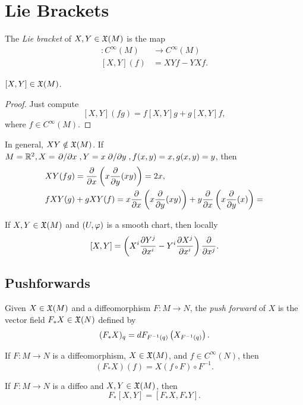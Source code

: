\section{Lie Brackets}
\begin{definition}
    The \textit{Lie bracket} of $X,Y \in \frak{X}(M)$ is the map
    \begin{align*}
    [X,Y]: C^\infty(M) &\longrightarrow C^\infty(M) \\
    [X,Y](f) &= XYf - YXf.
    \end{align*}
\end{definition}
\begin{lemma} %
    $[X,Y] \in \frak{X}(M)$. 
\end{lemma}
\begin{proof}
    Just compute
    $$[X,Y](fg) = f[X,Y]g + g[X,Y]f, $$ where $f \in C^\infty(M)$. 
\end{proof}
\begin{example}
    In general, $XY \notin \frak{X}(M)$. If $M=\mathbb{R}^2, X=\pdv*{}{x}, Y=x\pdv*{}{y}, f(x,y)=x, g(x,y)=y$, then 
    \begin{align*}
    &XY(fg) = \pdv{}{x}\left( {x\pdv{}{y}}(xy) \right) = 2x, \\
    &fXY(g) + gXY(f) = x\pdv{}{x}\left( {x\pdv{}{y}}(xy) \right) + y \pdv{}{x}\left( x{\pdv{}{y}}(x) \right) = 
    \end{align*}
\end{example}

\begin{proposition}
    If $X,Y \in \frak{X}(M)$ and $(U,\varphi)$ is a smooth chart, then locally
    $$ [X,Y] = \left(X^i \pdv{Y^j}{x^i} - Y^i \pdv{X^j}{x^i}\right) \pdv{}{x^j}. $$
\end{proposition}

\begin{proposition}\label{8.28}
    
\end{proposition}

\subsection*{Pushforwards}
Given $X \in \frak{X}(M)$ and a diffeomorphism $F:M \to N$, the \textit{push forward} of $X$ is the vector field $F_* X \in \frak{X}(N)$ defined by 
$$(F_* X)_q = dF_{F^{-1}(q)}\left( X_{F^{-1}(q)} \right). $$

\begin{lemma}
    If $F:M \to N$ is a diffeomorphism, $X \in \frak{X}(M)$, and $f \in C^\infty(N)$, then 
    $$(F_* X)(f) = X(f \circ F) \circ F^{-1}. $$
\end{lemma}

\begin{corollary}
    If $F:M \to N$ is a diffeo and $X,Y \in \frak{X}(M)$, then 
    $$F_*[X,Y] = [F_*X, F_*Y]. $$
\end{corollary}